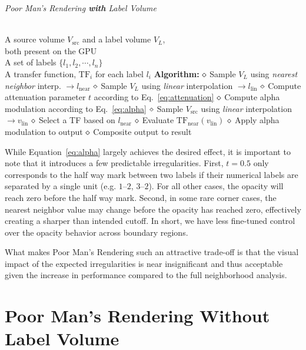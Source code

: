 \documentclass{egpubl}
\begin{document}
\begin{algorithm}[t]
\caption{\label{code:1} \emph{Poor Man's Rendering \textbf{with} Label Volume}}
\begin{algorithmic}
\REQUIRE \quad\\
A source volume $V_\mathrm{src}$ and a label volume $V_L$,\\both present on the GPU\\
A set of labels $\{ l_1, l_2, \cdots, l_n \}$ \\
A transfer function, $\mathrm{TF}_i$ for each label $l_i$ 
\STATE \hspace{-3mm}\textbf{Algorithm:}
 \nonumber
\STATE $\diamond$ Sample $V_L$ using \emph{nearest neighbor} interp. $\rightarrow l_\mathrm{near}$
\STATE $\diamond$ Sample $V_L$ using \emph{linear} interpolation $\rightarrow l_\mathrm{lin}$
\STATE $\diamond$ Compute attenuation parameter $t$ according to Eq.~\ref{eq:attenuation}
\STATE $\diamond$ Compute alpha modulation according to Eq.~\ref{eq:alpha}
\STATE $\diamond$ Sample $V_\mathrm{src}$ using \emph{linear} interpolation $\rightarrow v_\mathrm{lin}$ 
\STATE $\diamond$ Select a TF based on $l_\mathrm{near}$
\STATE $\diamond$ Evaluate $\mathrm{TF}_\mathrm{near}(v_\mathrm{lin})$ 
\STATE $\diamond$ Apply alpha modulation to output
\STATE $\diamond$ Composite output to result
\ENDFOR
\end{algorithmic}
\end{algorithm}

While Equation~\ref{eq:alpha} largely achieves the desired effect, it is important to note that it introduces a few predictable irregularities. First, $t=0.5$ only corresponds to the half way mark between two labels if their numerical labels are separated by a single unit (e.g. $1$--$2$, $3$--$2$). For all other cases, the opacity will reach zero before the half way mark. Second, in some rare corner cases, the nearest neighbor value may change before the opacity has reached zero, effectively creating a sharper than intended cutoff. In short, we have less fine-tuned control over the opacity behavior across boundary regions. 

What makes Poor Man's Rendering such an attractive trade-off is that the visual impact of the expected irregularities is near insignificant and thus acceptable given the increase in performance compared to the full neighborhood analysis.


\section{Poor Man's Rendering Without Label Volume}
\end{document}

